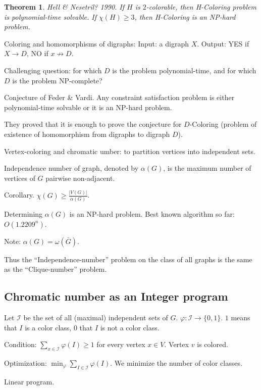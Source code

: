 \documentclass[12pt,a4paper]{article}
\newtheorem{theorem}{Theorem}
\begin{document}
\begin{theorem}
  Hell \& Nesetril? 1990.  If \(H\) is \(2\)-colorable, then H-Coloring problem
  is polynomial-time solvable.  If \(\chi(H) \geq 3\), then H-Coloring is an
  NP-hard problem.
\end{theorem}

Coloring and homomorphisms of digraphs:
Input: a digraph \(X\).
Output: YES if \(X \to D\), NO if \(x \not\to D\).

Challenging question: for which \(D\) is the problem polynomial-time, and for
which \(D\) is the problem NP-complete?

Conjecture of Feder \& Vardi. Any constraint satisfaction problem is either
polynomial-time solvable or it is an NP-hard problem.

They proved that it is enough to prove the conjecture for \(D\)-Coloring
(problem of existence of homomorphism from digraphs to digraph \(D\)).

Vertex-coloring and chromatic umber: to partition vertices into independent
sets.

Independence number of graph, denoted by \(\alpha(G)\), is the maximum number of
vertices of \(G\) pairwise non-adjacent.

Corollary. \(\chi(G) \geq \frac{|V(G)|}{\alpha(G)}\).

Determining \(\alpha(G)\) is an NP-hard problem.  Best known algorithm so far:
\(O(1.2209^n)\).

Note: \(\alpha(G) = \omega(\bar{G})\).

Thus the \enquote{Independence-number} problem on the class of all graphs is the
same as the \enquote{Clique-number} problem.

\subsection{Chromatic number as an Integer program}

Let \(\mathcal{I}\) be the set of all (maximal) independent sets of \(G\).
\(\varphi: \mathcal{I} \to \{0, 1\}\). \(1\) means that \(I\) is a color class,
\(0\) that \(I\) is not a color class.

Condition: \(\sum_{x \in \mathcal{I}} \varphi(I) \geq 1\) for every vertex
\(x \in V\). Vertex \(v\) is colored.

Optimization: \(\min_{\varphi} \sum_{I \in \mathcal{I}} \varphi(I)\). We
minimize the number of color classes.

Linear program.
\end{document}
